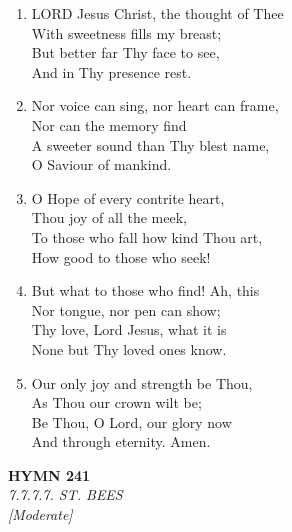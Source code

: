 \documentclass[11pt,a4paper]{article}
\begin{document}
\begin{enumerate}
    \item LORD Jesus Christ, the thought of Thee \\
        With sweetness fills my breast; \\
        But better far Thy face to see, \\
        And in Thy presence rest.

    \item Nor voice can sing, nor heart can frame, \\
        Nor can the memory find \\
        A sweeter sound than Thy blest name, \\
        O Saviour of mankind.

    \item O Hope of every contrite heart, \\
        Thou joy of all the meek, \\
        To those who fall how kind Thou art, \\
        How good to those who seek!

    \item But what to those who find! Ah, this \\
        Nor tongue, nor pen can show; \\
        Thy love, Lord Jesus, what it is \\
        None but Thy loved ones know.

    \item Our only joy and strength be Thou, \\
        As Thou our crown wilt be; \\
        Be Thou, O Lord, our glory now \\
        And through eternity. Amen.

\end{enumerate}

\newpage
\begin{center}
    {\Large \textbf{HYMN 241}}
    \\
    \textit{7.7.7.7. ST. BEES}
    \\
    \textit{\small [Moderate]}
\end{center}
\vspace{1em}
\end{document}
